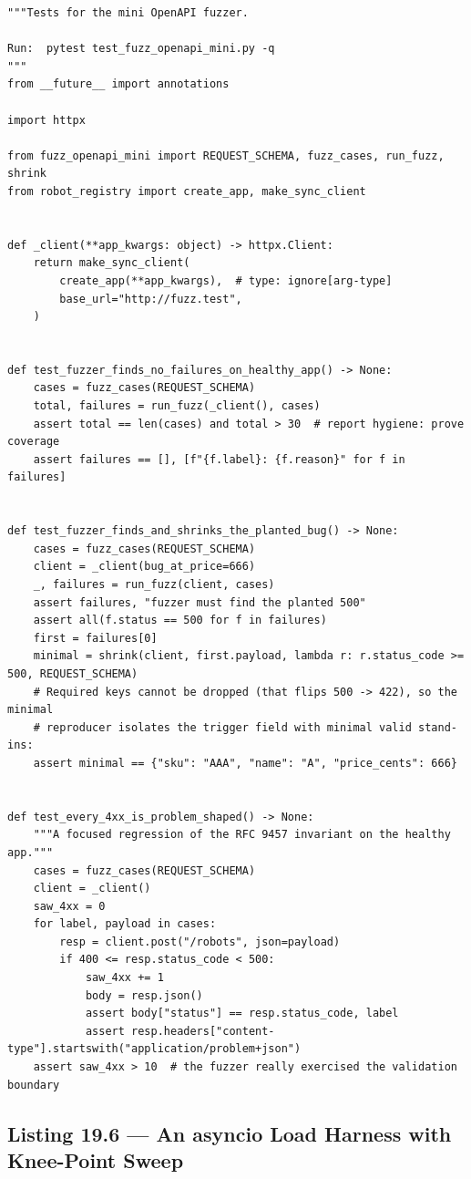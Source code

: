 \begin{verbatim}
"""Tests for the mini OpenAPI fuzzer.

Run:  pytest test_fuzz_openapi_mini.py -q
"""
from __future__ import annotations

import httpx

from fuzz_openapi_mini import REQUEST_SCHEMA, fuzz_cases, run_fuzz, shrink
from robot_registry import create_app, make_sync_client


def _client(**app_kwargs: object) -> httpx.Client:
    return make_sync_client(
        create_app(**app_kwargs),  # type: ignore[arg-type]
        base_url="http://fuzz.test",
    )


def test_fuzzer_finds_no_failures_on_healthy_app() -> None:
    cases = fuzz_cases(REQUEST_SCHEMA)
    total, failures = run_fuzz(_client(), cases)
    assert total == len(cases) and total > 30  # report hygiene: prove coverage
    assert failures == [], [f"{f.label}: {f.reason}" for f in failures]


def test_fuzzer_finds_and_shrinks_the_planted_bug() -> None:
    cases = fuzz_cases(REQUEST_SCHEMA)
    client = _client(bug_at_price=666)
    _, failures = run_fuzz(client, cases)
    assert failures, "fuzzer must find the planted 500"
    assert all(f.status == 500 for f in failures)
    first = failures[0]
    minimal = shrink(client, first.payload, lambda r: r.status_code >= 500, REQUEST_SCHEMA)
    # Required keys cannot be dropped (that flips 500 -> 422), so the minimal
    # reproducer isolates the trigger field with minimal valid stand-ins:
    assert minimal == {"sku": "AAA", "name": "A", "price_cents": 666}


def test_every_4xx_is_problem_shaped() -> None:
    """A focused regression of the RFC 9457 invariant on the healthy app."""
    cases = fuzz_cases(REQUEST_SCHEMA)
    client = _client()
    saw_4xx = 0
    for label, payload in cases:
        resp = client.post("/robots", json=payload)
        if 400 <= resp.status_code < 500:
            saw_4xx += 1
            body = resp.json()
            assert body["status"] == resp.status_code, label
            assert resp.headers["content-type"].startswith("application/problem+json")
    assert saw_4xx > 10  # the fuzzer really exercised the validation boundary
\end{verbatim}

\subsection{Listing 19.6 --- An asyncio Load Harness with Knee-Point Sweep}
\label{sec:ch19-listing-load}

